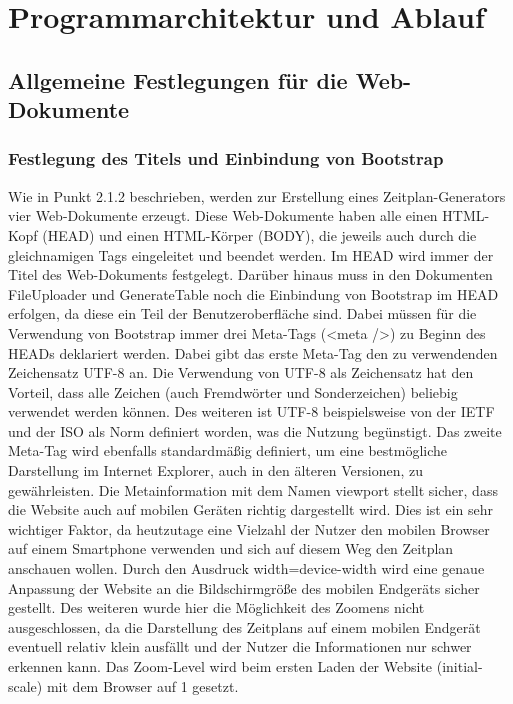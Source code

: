 {\section{Programmarchitektur und Ablauf}

\subsection{Allgemeine Festlegungen für die Web-Dokumente}

\subsubsection{Festlegung des Titels und Einbindung von Bootstrap}
Wie in Punkt 2.1.2 beschrieben, werden zur Erstellung eines Zeitplan-Generators vier Web-Dokumente erzeugt. Diese Web-Dokumente haben alle einen HTML-Kopf (HEAD) und einen HTML-Körper (BODY), die jeweils auch durch die gleichnamigen Tags eingeleitet und beendet werden. 
Im HEAD wird immer der Titel des Web-Dokuments festgelegt. 
Darüber hinaus muss in den Dokumenten FileUploader und GenerateTable noch die Einbindung von Bootstrap im HEAD erfolgen, da diese ein Teil der Benutzeroberfläche sind. 
Dabei müssen für die Verwendung von Bootstrap immer drei Meta-Tags (<meta />) zu Beginn des HEADs deklariert werden. 
Dabei gibt das erste Meta-Tag den zu verwendenden Zeichensatz \ac{UTF-8} an. Die Verwendung von UTF-8 als Zeichensatz hat den Vorteil, dass alle Zeichen (auch Fremdwörter und Sonderzeichen) beliebig verwendet werden können. Des weiteren ist UTF-8 beispielsweise von der \ac{IETF} und der \ac{ISO} als Norm definiert worden, was die Nutzung begünstigt. 
Das zweite Meta-Tag wird ebenfalls standardmäßig definiert, um eine bestmögliche Darstellung im Internet Explorer, auch in den älteren Versionen, zu gewährleisten. 
Die Metainformation mit dem Namen viewport stellt sicher, dass die Website auch auf mobilen Geräten richtig dargestellt wird. Dies ist ein sehr wichtiger Faktor, da heutzutage eine Vielzahl der Nutzer den mobilen Browser auf einem Smartphone verwenden und sich auf diesem Weg den Zeitplan anschauen wollen. Durch den Ausdruck width=device-width wird eine genaue Anpassung der Website an die Bildschirmgröße des mobilen Endgeräts sicher gestellt. Des weiteren wurde hier die Möglichkeit des Zoomens nicht ausgeschlossen, da die Darstellung des Zeitplans auf einem mobilen Endgerät eventuell relativ klein ausfällt und der Nutzer die Informationen nur schwer erkennen kann. Das Zoom-Level wird beim ersten Laden der Website (initial-scale) mit dem Browser auf 1 gesetzt. 
}
